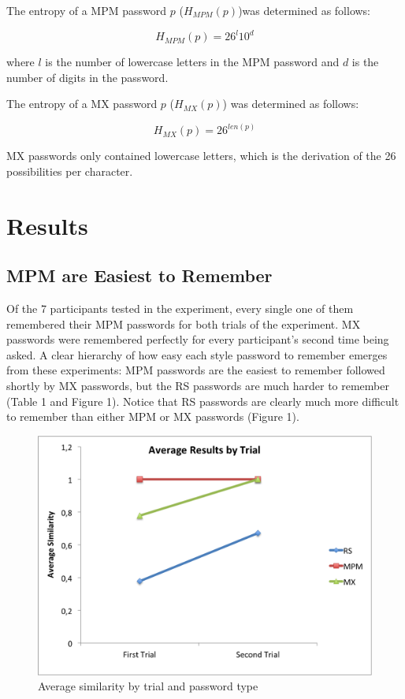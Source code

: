 \documentclass{article}
\begin{document}
The entropy of a MPM password $p$ ($H_{MPM}(p)$)was determined as follows:

$$H_{MPM}(p) = 26^l10^d$$

where $l$ is the number of lowercase letters in the MPM password and $d$ is the number of digits in the password.

The entropy of a MX password $p$ ($H_{MX}(p)$) was determined as follows:

$$H_{MX}(p) = 26^{len(p)}$$

MX passwords only contained lowercase letters, which is the derivation of the 26 possibilities per character.

\FloatBarrier
\section*{Results}
\subsection*{MPM are Easiest to Remember}
Of the 7 participants tested in the experiment, every single one of them remembered their MPM passwords for both trials of the experiment. MX passwords were remembered perfectly for every participant's second time being asked. A clear hierarchy of how easy each style password to remember emerges from these experiments: MPM passwords are the easiest to remember followed shortly by MX passwords, but the RS passwords are much harder to remember (Table 1 and Figure 1). Notice that RS passwords are clearly much more difficult to remember than either MPM or MX passwords (Figure 1).
\begin{figure}
\centering
\includegraphics[scale=0.75]{resultsByTrial.png}
\caption{Average similarity by trial and password type}
\end{figure}
\end{document}

